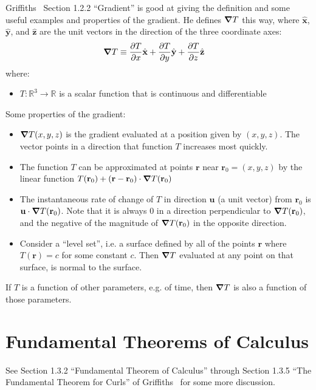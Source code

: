 \documentclass[a4paper]{article}
\theoremstyle{plain}
\theoremstyle{definition}
\newcommand{\vect}[1]{\textbf{#1}}
\newcommand{\hatvec}[1]{\hat{\textbf{#1}}}
\newcommand{\reals}{\mathbb{R}}
\begin{document}
Griffiths~\cite{Griffiths1998} Section 1.2.2 ``Gradient'' is good at
giving the definition and some useful examples and properties of the
gradient.  He defines $\grad T$ this way, where $\hatvec{x}$,
$\hatvec{y}$, and $\hatvec{z}$ are the unit vectors in the direction
of the three coordinate axes:
\begin{align*}
  \grad T & \equiv \frac{\partial T}{\partial x} \hatvec{x}
                 + \frac{\partial T}{\partial y} \hatvec{y}
                 + \frac{\partial T}{\partial z} \hatvec{z}
\end{align*}
where:
\begin{itemize}
  \item $T : \reals^3 \rightarrow \reals$ is a scalar function that is
    continuous and differentiable
\end{itemize}
Some properties of the gradient:
\begin{itemize}
  \item $\grad T(x, y, z)$ is the gradient evaluated at a position
    given by $(x, y, z)$.  The vector points in a direction that
    function $T$ increases most quickly.
  \item The function $T$ can be approximated at points $\vect{r}$ near
    $\vect{r}_0 = (x, y, z)$ by the linear function $T(\vect{r}_0) +
    (\vect{r} - \vect{r}_0) \cdot \grad T(\vect{r}_0)$
  \item The instantaneous rate of change of $T$ in direction
    $\vect{u}$ (a unit vector) from $\vect{r}_0$ is $\vect{u} \cdot
    \grad T(\vect{r}_0)$.  Note that it is always 0 in a direction
    perpendicular to $\grad T(\vect{r}_0)$, and the negative of the
    magnitude of $\grad T(\vect{r}_0)$ in the opposite direction.
  \item Consider a ``level set'', i.e. a surface defined by all of the
    points $\vect{r}$ where $T(\vect{r})=c$ for some constant $c$.
    Then $\grad T$ evaluated at any point on that surface, is normal
    to the surface.
\end{itemize}

If $T$ is a function of other parameters, e.g. of time, then $\grad T$
is also a function of those parameters.


\section{Fundamental Theorems of Calculus}

See Section 1.3.2 ``Fundamental Theorem of Calculus'' through Section
1.3.5 ``The Fundamental Theorem for Curls'' of
Griffiths~\cite{Griffiths1998} for some more discussion.
\end{document}
